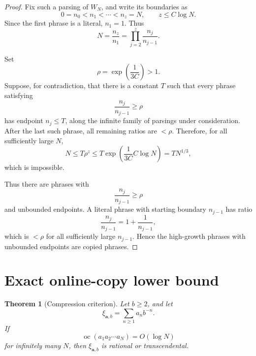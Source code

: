 \documentclass[11pt]{amsart}
\newtheorem{theorem}{Theorem}[section]
\theoremstyle{definition}
\DeclareMathOperator{\oc}{oc}
\begin{document}
\begin{proof}
Fix such a parsing of \(W_N\), and write its boundaries as
\[
0=n_0<n_1<\cdots<n_z=N,
\qquad
z\leq C\log N.
\]
Since the first phrase is a literal, \(n_1=1\). Thus
\[
N=\frac{n_z}{n_1}
=
\prod_{j=2}^{z}\frac{n_j}{n_{j-1}}.
\]

Set
\[
\rho=\exp\left(\frac1{3C}\right)>1.
\]
Suppose, for contradiction, that there is a constant \(T\) such that every phrase satisfying
\[
\frac{n_j}{n_{j-1}}\geq \rho
\]
has endpoint \(n_j\leq T\), along the infinite family of parsings under consideration. After the last such phrase, all remaining ratios are \(<\rho\). Therefore, for all sufficiently large \(N\),
\[
N\leq T\rho^z
\leq
T\exp\left(\frac1{3C}C\log N\right)
=
TN^{1/3},
\]
which is impossible.

Thus there are phrases with
\[
\frac{n_j}{n_{j-1}}\geq \rho
\]
and unbounded endpoints. A literal phrase with starting boundary \(n_{j-1}\) has ratio
\[
\frac{n_j}{n_{j-1}}
=
1+\frac1{n_{j-1}},
\]
which is \(<\rho\) for all sufficiently large \(n_{j-1}\). Hence the high-growth phrases with unbounded endpoints are copied phrases.
\end{proof}

\section{Exact online-copy lower bound}

\begin{theorem}[Compression criterion]
Let \(b\geq 2\), and let
\[
\xi_{\mathbf a,b}
=
\sum_{n\geq 1}a_n b^{-n}.
\]
If
\[
\oc(a_1a_2\cdots a_N)=O(\log N)
\]
for infinitely many \(N\), then \(\xi_{\mathbf a,b}\) is rational or transcendental.
\end{theorem}
\end{document}
